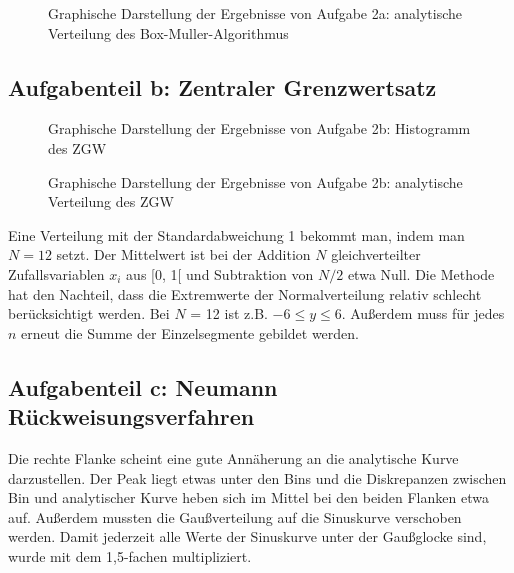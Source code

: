 \begin{landscape}
	\begin{figure}
		\caption{Graphische Darstellung der Ergebnisse von Aufgabe 2a: analytische Verteilung des Box-Muller-Algorithmus}
		\label{fig:2a_v}
	\end{figure}
\end{landscape}

\subsection*{Aufgabenteil b: Zentraler Grenzwertsatz}

\begin{landscape}
	\begin{figure}
		\caption{Graphische Darstellung der Ergebnisse von Aufgabe 2b: Histogramm des ZGW}
		\label{fig:2b}
	\end{figure}
\end{landscape}

\begin{landscape}
	\begin{figure}
		\caption{Graphische Darstellung der Ergebnisse von Aufgabe 2b: analytische Verteilung des ZGW}
		\label{fig:2b_v}
	\end{figure}
\end{landscape}

Eine Verteilung mit der Standardabweichung 1 bekommt man, indem man $N = 12$ setzt. Der Mittelwert ist bei der Addition $N$ gleichverteilter Zufallsvariablen $x_i$ aus [0, 1[ und Subtraktion von $N/2$ etwa Null. Die Methode hat den Nachteil, dass die Extremwerte der Normalverteilung relativ schlecht berücksichtigt werden. Bei $N$ = 12 ist z.B. $-6 \leq y \leq 6$. Außerdem muss für jedes $n$ erneut die Summe der Einzelsegmente gebildet werden. 

\subsection*{Aufgabenteil c: Neumann Rückweisungsverfahren}
Die rechte Flanke scheint eine gute Annäherung an die analytische Kurve darzustellen. Der Peak liegt etwas unter den Bins und die Diskrepanzen zwischen Bin und analytischer Kurve heben sich im Mittel bei den beiden Flanken etwa auf.
Außerdem mussten die Gaußverteilung auf die Sinuskurve verschoben werden. Damit jederzeit alle Werte der Sinuskurve unter der Gaußglocke sind, wurde mit dem 1,5-fachen multipliziert.

